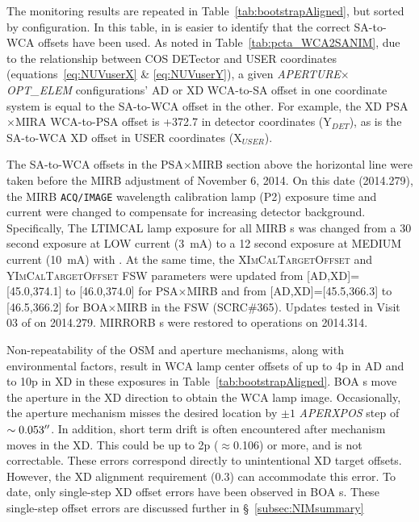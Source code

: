 

The  monitoring results are repeated in Table~\ref{tab:bootstrapAligned}, but sorted by configuration.
In this table, in is easier to identify that the correct SA-to-WCA offsets have been used. As noted in Table~\ref{tab:pcta_WCA2SANIM},
due to the relationship between COS DETector and USER coordinates (equations~\ref{eq:NUVuserX} \& \ref{eq:NUVuserY}),
a given \textit{APERTURE}$\times$\textit{OPT\_ELEM} configurations' AD or XD WCA-to-SA offset in one coordinate system is equal to the SA-to-WCA offset in the other.
For example, the XD PSA$\times$MIRA WCA-to-PSA offset is +372.7 in detector coordinates (Y$_{DET}$), as is the SA-to-WCA XD offset in USER coordinates (X$_{USER}$).

The SA-to-WCA offsets in the PSA$\times$MIRB section above the horizontal line were taken before
the MIRB  adjustment of November 6, 2014. On this date (2014.279), the MIRB \texttt{ACQ/IMAGE} wavelength calibration lamp (P2) exposure time and current were changed
to compensate for increasing detector background. Specifically,
The \textsc{LTIMCAL} lamp exposure for all MIRB s was changed
from a 30 second exposure at LOW current (3~mA) to a 12 second exposure at MEDIUM current (10~mA) with .
At the same time, the \textsc{XImCalTargetOffset} and \textsc{YImCalTargetOffset} FSW parameters were updated from [AD,XD]=[45.0,374.1] to [46.0,374.0] for PSA$\times$MIRB
and from [AD,XD]=[45.5,366.3] to [46.5,366.2] for BOA$\times$MIRB in the FSW (\textsc{SCRC\#365}).
Updates tested in Visit 03 of  on 2014.279. MIRRORB s were restored to operations on 2014.314.

Non-repeatability of the OSM and aperture mechanisms, along with environmental factors, result in WCA lamp center offsets of up to 4p in AD and to 10p in XD in these exposures in Table~\ref{tab:bootstrapAligned}.
BOA s move the aperture in the XD direction to obtain the WCA lamp image. Occasionally, the aperture mechanism misses the desired location by $\pm 1 $ \textit{APERXPOS} step of $\sim0.053\hbox{$^{\prime\prime}$}$.
In addition, short term drift is often encountered after mechanism moves in the XD. This could be up to 2p ($\approx$0.106\arcsec) or more, and is not correctable. These errors correspond directly to unintentional XD target offsets. However, the XD alignment requirement (0.3\arcsec) can accommodate this error.
To date, only single-step XD offset errors have been observed in BOA s.
These single-step offset errors are discussed further in \S~\ref{subsec:NIMsummary}

